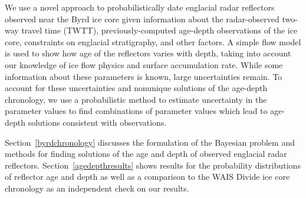 We use a novel approach to probabilistically date englacial radar reflectors observed near the Byrd ice core given information about the radar-observed two-way travel time (TWTT), previously-computed age-depth observations of the ice core, constraints on englacial stratigraphy, and other factors. A simple flow model is used to show how age of the reflectors varies with depth, taking into account our knowledge of ice flow physics and surface accumulation rate. While some information about these parameters is known, large uncertainties remain. To account for these uncertainties and nonunique solutions of the age-depth chronology, we use a probabilistic method to estimate uncertainty in the parameter values to find combinations of parameter values which lead to age-depth solutions consistent with observations.





Section~\ref{byrdchronology} discusses the formulation of the Bayesian problem and methods for finding solutions of the age and depth of observed englacial radar reflectors. Section~\ref{agedepthresults} shows results for the probability distributions of reflector age and depth as well as a comparison to the WAIS Divide ice core chronology as an independent check on our results. %
